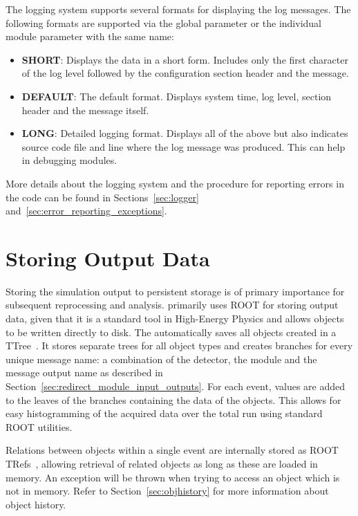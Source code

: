 The logging system supports several formats for displaying the log messages.
The following formats are supported via the global parameter  or the individual module parameter with the same name:
\begin{itemize}
\item \textbf{SHORT}: Displays the data in a short form.
Includes only the first character of the log level followed by the configuration section header and the message.
\item \textbf{DEFAULT}: The default format.
Displays system time, log level, section header and the message itself.
\item \textbf{LONG}: Detailed logging format.
Displays all of the above but also indicates source code file and line where the log message was produced.
This can help in debugging modules.
\end{itemize}

More details about the logging system and the procedure for reporting errors in the code can be found in Sections~\ref{sec:logger} and~\ref{sec:error_reporting_exceptions}.

\section{Storing Output Data}
\label{sec:storing_output_data}
Storing the simulation output to persistent storage is of primary importance for subsequent reprocessing and analysis.
\apsq primarily uses ROOT for storing output data, given that it is a standard tool in High-Energy Physics and allows objects to be written directly to disk.
The  automatically saves all objects created in a TTree~\cite{roottree}.
It stores separate trees for all object types and creates branches for every unique message name: a combination of the detector, the module and the message output name as described in Section~\ref{sec:redirect_module_input_outputs}.
For each event, values are added to the leaves of the branches containing the data of the objects.
This allows for easy histogramming of the acquired data over the total run using standard ROOT utilities.

Relations between objects within a single event are internally stored as ROOT TRefs~\cite{roottref}, allowing retrieval of related objects as long as these are loaded in memory.
An exception will be thrown when trying to access an object which is not in memory.
Refer to Section~\ref{sec:objhistory} for more information about object history.

